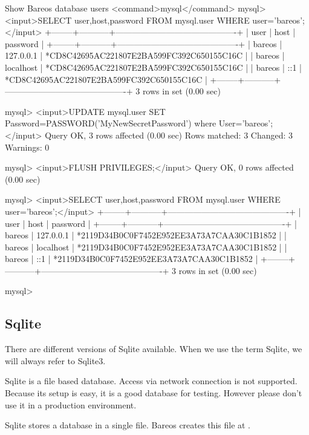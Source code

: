 \begin{commands}{Show Bareos database users}
<command>mysql</command>
mysql> <input>SELECT user,host,password FROM mysql.user WHERE user='bareos';</input>
+--------+-----------+-------------------------------------------+
| user   | host      | password                                  |
+--------+-----------+-------------------------------------------+
| bareos | 127.0.0.1 | *CD8C42695AC221807E2BA599FC392C650155C16C |
| bareos | localhost | *CD8C42695AC221807E2BA599FC392C650155C16C |
| bareos | ::1       | *CD8C42695AC221807E2BA599FC392C650155C16C |
+--------+-----------+-------------------------------------------+
3 rows in set (0.00 sec)

mysql> <input>UPDATE mysql.user SET Password=PASSWORD('MyNewSecretPassword') where User='bareos';</input>
Query OK, 3 rows affected (0.00 sec)
Rows matched: 3  Changed: 3  Warnings: 0

mysql> <input>FLUSH PRIVILEGES;</input>
Query OK, 0 rows affected (0.00 sec)

mysql> <input>SELECT user,host,password FROM mysql.user WHERE user='bareos';</input>
+--------+-----------+-------------------------------------------+
| user   | host      | password                                  |
+--------+-----------+-------------------------------------------+
| bareos | 127.0.0.1 | *2119D34B0C0F7452E952EE3A73A7CAA30C1B1852 |
| bareos | localhost | *2119D34B0C0F7452E952EE3A73A7CAA30C1B1852 |
| bareos | ::1       | *2119D34B0C0F7452E952EE3A73A7CAA30C1B1852 |
+--------+-----------+-------------------------------------------+
3 rows in set (0.00 sec)

mysql> 

\end{commands}



\subsection{Sqlite}

There are different versions of Sqlite available. When we use the term Sqlite, we will always refer to Sqlite3.

Sqlite is a file based database. Access via network connection is not supported.
Because its setup is easy, it is a good database for testing.
However please don't use it in a production environment.

Sqlite stores a database in a single file.
Bareos creates this file at .


